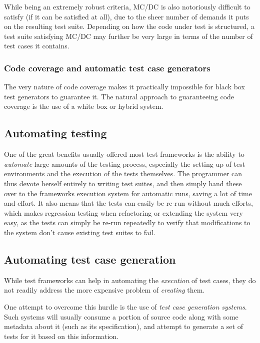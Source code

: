 \documentclass{article}
\newcommand{\tmem}[1]{{\em #1\/}}
\begin{document}
While being an extremely robust criteria, MC/DC is also notoriously difficult
to satisfy (if it can be satisfied at all), due to the sheer number of demands
it puts on the resulting test suite. Depending on how the code under test is
structured, a test suite satisfying MC/DC may further be very large in terms
of the number of test cases it contains.



\subsubsection{Code coverage and automatic test case generators}

The very nature of code coverage makes it practically impossible for black box
test generators to guarantee it. The natural approach to guaranteeing code
coverage is the use of a white box or hybrid system.

\subsection{Automating testing}

One of the great benefits usually offered most test frameworks is the ability
to {\tmem{automate}} large amounts of the testing process, especially the
setting up of test environments and the execution of the tests themselves. The
programmer can thus devote herself entirely to writing test suites, and then
simply hand these over to the frameworks execution system for automatic runs,
saving a lot of time and effort. It also means that the tests can easily be
re-run without much efforts, which makes regression testing when refactoring
or extending the system very easy, as the tests can simply be re-run
repeatedly to verify that modifications to the system don't cause existing
test suites to fail.

\subsection{Automating test case generation}

While test frameworks can help in automating the {\tmem{execution}} of test
cases, they do not readily address the more expensive problem of
{\tmem{creating}} them.



One attempt to overcome this hurdle is the use of {\tmem{test case generation
systems}}. Such systems will usually consume a portion of source code along
with some metadata about it (such as its specification), and attempt to
generate a set of tests for it based on this information.
\end{document}
